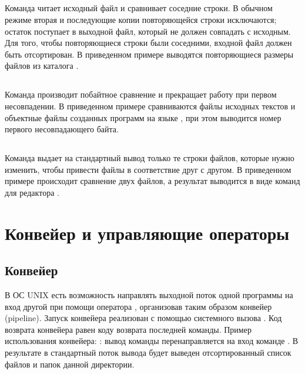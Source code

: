 \vspace{-1em}
\subsection{}

Команда  читает исходный файл и сравнивает соседние строки. В обычном режиме вторая и последующие копии повторяющейся строки исключаются; остаток поступает в выходной файл, который не должен совпадать с исходным. Для того, чтобы повторяющиеся строки были соседними, входной файл должен быть отсортирован. В приведенном примере выводятся повторяющиеся размеры файлов из каталога . 


\vspace{-1em}
\subsection{}

Команда  производит побайтное сравнение и прекращает работу при первом несовпадении. В приведенном примере сравниваются файлы исходных текстов и объектные файлы созданных программ на языке , при этом выводится номер первого несовпадающего байта.


\subsection{}

Команда  выдает на стандартный вывод только те строки файлов, которые нужно изменить, чтобы привести файлы в соответствие друг с другом. В приведенном примере происходит сравнение двух файлов, а результат выводится в виде команд для редактора .


\section{Конвейер и управляющие операторы}

\subsection{Конвейер}

В ОС UNIX есть возможность направлять выходной поток одной программы на вход другой при помощи оператора \code{|}, организовав таким образом конвейер (pipeline). Запуск конвейера реализован с помощью системного вызова . Код возврата конвейера равен коду возврата последней команды. Пример использования конвейера: : вывод команды  перенаправляется на вход команде . В результате в стандартный поток вывода будет выведен отсортированный список файлов и папок данной директории.

